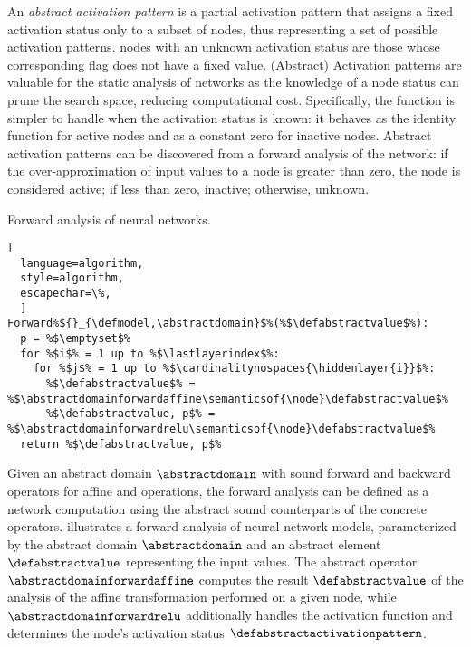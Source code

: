 An \emph{abstract activation pattern} is a partial activation pattern that assigns a fixed activation status only to a subset of \relu{} nodes, thus representing a set of possible activation patterns. \relu{} nodes with an unknown activation status are those whose corresponding flag does not have a fixed value. (Abstract) Activation patterns are valuable for the static analysis of networks as the knowledge of a node status can prune the search space, reducing computational cost. Specifically, the \relu{} function is simpler to handle when the activation status is known: it behaves as the identity function for active nodes and as a constant zero for inactive nodes. Abstract activation patterns can be discovered from a forward analysis of the network: if the over-approximation of input values to a node is greater than zero, the node is considered active; if less than zero, inactive; otherwise, unknown.


\begin{marginalgorithm}
  \caption{Forward analysis of neural networks.}
\begin{lstlisting}[
  language=algorithm,
  style=algorithm,
  escapechar=\%,
  ]
Forward%${}_{\defmodel,\abstractdomain}$%(%$\defabstractvalue$%):
  p = %$\emptyset$%
  for %$i$% = 1 up to %$\lastlayerindex$%:
    for %$j$% = 1 up to %$\cardinalitynospaces{\hiddenlayer{i}}$%:
      %$\defabstractvalue$% = %$\abstractdomainforwardaffine\semanticsof{\node}\defabstractvalue$%
      %$\defabstractvalue, p$% = %$\abstractdomainforwardrelu\semanticsof{\node}\defabstractvalue$%
  return %$\defabstractvalue, p$%
\end{lstlisting}
\end{marginalgorithm}



Given an abstract domain $\abstractdomain$ with sound forward and backward operators for affine and \relu{} operations, the forward analysis can be defined as a network computation using the abstract sound counterparts of the concrete operators.  illustrates a forward analysis of neural network models, parameterized by the abstract domain $\abstractdomain$ and an abstract element $\defabstractvalue$ representing the input values. The abstract operator $\abstractdomainforwardaffine$ computes the result $\defabstractvalue$ of the analysis of the
affine transformation performed on a given node, while $\abstractdomainforwardrelu$ additionally handles the \relu{} activation function and determines the node's activation status $\defabstractactivationpattern$.

